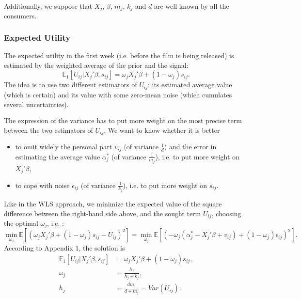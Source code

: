	Additionally, we suppose that $X_{j}$, $\beta$, $m_{j}$, $k_{j}$ and $d$ are well-known by all the consumers.

	\subsubsection{Expected Utility}

			The expected utility in the first week (i.e. before the film is being released) is estimated by the weighted average of the prior and the signal:
	\begin{equation*}
		\mathbb{E}_1[U_{i j}|X_{j}'\beta, s_{i j}]=\omega_{j} X_{j}'\beta+(1-\omega_{j})s_{i j}.
	\end{equation*}
	The idea is to use two different estimators of $U_{i j}$: its estimated average value (which is certain) and its value with some zero-mean noise (which cumulates several uncertainties).

	The expression of the variance has to put more weight on the most precise term between the two estimators of $U_{i j}$. 
	We want to know whether it is better 
	\begin{itemize}
		\item to omit widely the personal part $v_{i j}$ (of variance $\frac{1}{d}$) and the error in estimating the average value $\alpha_{j}^{*}$ (of variance $\frac{1}{m_{j}}$), i.e. to put more weight on $X_{j}'\beta$,
		\item to cope with noise $\epsilon_{i j}$ (of variance $\frac{1}{k_{j}}$), i.e. to put more weight on $s_{i j}$.\\
	\end{itemize}

	Like in the WLS approach, we minimize the expected value of the square difference between the right-hand side above, and the sought term $U_{i j}$, choosing the optimal $\omega_{j}$, i.e. :
	\begin{equation}
		\min_{\omega_{j}} \mathbb{E}[(\omega_{j} X_{j}'\beta+(1-\omega_{j})s_{i j}-U_{i j})^{2}]=\min_{\omega_{j}} \mathbb{E}[(-\omega_{j} (\alpha_{j}^{*}-X_{j}'\beta+v_{i j})+(1-\omega_{j})\epsilon_{i j})^{2}].
	\end{equation}
	According to Appendix 1, the solution is
	\begin{align*}
		\mathbb{E}_1[U_{i j}|X_{j}'\beta, s_{i j}]&=\omega_{j} X_{j}'\beta+(1-\omega_{j})s_{i j},\\
		\omega_j&=\frac{h_{j}}{h_{j}+k_{j}},\\
		h_{j}&=\frac{d m_{j}}{d+m_{j}}=Var(U_{i j}).
	\end{align*}

